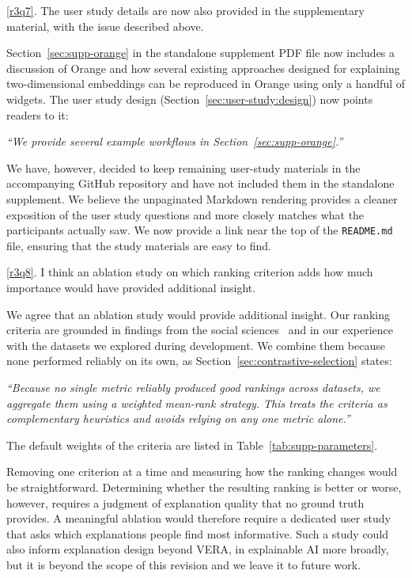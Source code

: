 \documentclass[11pt]{article}
\newcounter{rtaskno}
\newcommand{\rtask}[1]{\refstepcounter{rtaskno}\label{#1}}
\newcommand{\reviewc}[2]{\begin{leftbar}\noindent\rtask{#1}\ref{#1}. #2\end{leftbar}\vspace*{-4mm}}
\newcommand{\answer}[1]{\noindent #1\par\vspace{2mm}}
\newcommand{\copyquote}[1]{\vspace{1mm} {\itshape ``#1''}\vspace{1mm}}
\newlength{\leftbarwidth}
\newlength{\leftbarsep}
\renewenvironment{leftbar}{%
    \def\FrameCommand{{\color{black}{\vrule width \leftbarwidth\relax\hspace {\leftbarsep}}}}%
    \MakeFramed {\advance \hsize -\width \FrameRestore }%
}{\endMakeFramed}
\begin{document}
\reviewc{r3q7}{The user study details are now also provided in the supplementary material, with the issue described above.}

\answer{%
Section~\ref{sec:supp-orange} in the standalone supplement PDF file now includes a discussion of Orange and how several existing approaches designed for explaining two-dimensional embeddings can be reproduced in Orange using only a handful of widgets. The user study design (Section~\ref{sec:user-study:design}) now points readers to it:

\copyquote{We provide several example workflows in Section~\ref{sec:supp-orange}.}

We have, however, decided to keep remaining user-study materials in the accompanying GitHub repository and have not included them in the standalone supplement. We believe the unpaginated Markdown rendering provides a cleaner exposition of the user study questions and more closely matches what the participants actually saw. We now provide a link near the top of the \texttt{README.md} file, ensuring that the study materials are easy to find.
}

\reviewc{r3q8}{I think an ablation study on which ranking criterion adds how much importance would have provided additional insight.}

\answer{%
We agree that an ablation study would provide additional insight. Our ranking criteria are grounded in findings from the social sciences~\citep{Miller2019} and in our experience with the datasets we explored during development. We combine them because none performed reliably on its own, as Section~\ref{sec:contrastive-selection} states:

\copyquote{Because no single metric reliably produced good rankings across datasets, we aggregate them using a weighted mean-rank strategy. This treats the criteria as complementary heuristics and avoids relying on any one metric alone.}

The default weights of the criteria are listed in Table~\ref{tab:supp-parameters}.

Removing one criterion at a time and measuring how the ranking changes would be straightforward. Determining whether the resulting ranking is better or worse, however, requires a judgment of explanation quality that no ground truth provides. A meaningful ablation would therefore require a dedicated user study that asks which explanations people find most informative. Such a study could also inform explanation design beyond VERA, in explainable AI more broadly, but it is beyond the scope of this revision and we leave it to future work.
}
\end{document}
